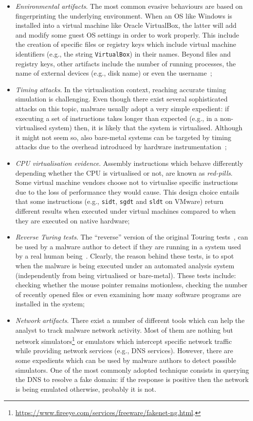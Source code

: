\documentclass[LaM,binding=0.6cm]{sapthesis}
\begin{document}
\begin{itemize}
\item \textit{Environmental artifacts}. The most common evasive behaviours are based on fingerprinting the underlying environment. When an OS like Windows is installed into a virtual machine like Oracle VirtualBox, the latter will add and modify some guest OS settings in order to work properly. This include the creation of specific files or registry keys which include virtual machine identifiers (e.g., the string \texttt{VirtualBox}) in their names. Beyond files and registry keys, other artifacts include the number of running processes, the name of external devices (e.g., disk name) or even the username~\cite{lindorfer2011detecting};
\item \textit{Timing attacks}. In the virtualisation context, reaching accurate timing simulation is challenging. Even though there exist several sophisticated attacks on this topic, malware usually adopt a very simple expedient: if executing a set of instructions takes longer than expected (e.g., in a non-virtualised system) then, it is likely that the system is virtualised. Although it might not seem so, also bare-metal systems can be targeted by timing attacks due to the overhead introduced by hardware instrumentation~\cite{spensky2016phi};
\item \textit{CPU virtualisation evidence}. Assembly instructions which behave differently depending whether the CPU is virtualised or not, are known as \textit{red-pills}. Some virtual machine vendors choose not to virtualise specific instructions due to the loss of performance they would cause. This design choice entails that some instructions (e.g., \texttt{sidt}, \texttt{sgdt} and \texttt{sldt} on VMware) return different results when executed under virtual machines compared to when they are executed on native hardware;
\item \textit{Reverse Turing tests}. The ``reverse'' version of the original Touring tests~\cite{turing2009computing}, can be used by a malware author to detect if they are running in a system used by a real human being~\cite{miramirkhani2017spotless}. Clearly, the reason behind these tests, is to spot when the malware is being executed under an automated analysis system (independently from being virtualised or bare-metal). These tests include: checking whether the mouse pointer remains motionless, checking the number of recently opened files or even examining how many software programs are installed in the system;
\item \textit{Network artifacts}. There exist a number of different tools which can help the analyst to track malware network activity. Most of them are nothing but network simulators\footnote{\url{https://www.fireeye.com/services/freeware/fakenet-ng.html}.} or emulators which intercept specific network traffic while providing network services (e.g., DNS services). However, there are some expedients which can be used by malware authors to detect possible simulators. One of the most commonly adopted technique consists in querying the DNS to resolve a fake domain: if the response is positive then the network is being emulated otherwise, probably it is not.
\end{itemize}
\end{document}
